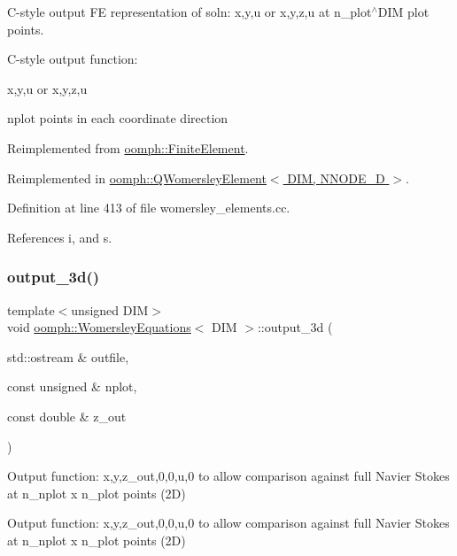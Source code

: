 C-\/style output FE representation of soln\+: x,y,u or x,y,z,u at n\+\_\+plot$^\wedge$\+D\+IM plot points. 

C-\/style output function\+:

x,y,u or x,y,z,u

nplot points in each coordinate direction 

Reimplemented from \hyperlink{classoomph_1_1FiniteElement_adfaee690bb0608f03320eeb9d110d48c}{oomph\+::\+Finite\+Element}.



Reimplemented in \hyperlink{classoomph_1_1QWomersleyElement_aedac8e0c2b41e446b7c835731b179255}{oomph\+::\+Q\+Womersley\+Element$<$ D\+I\+M, N\+N\+O\+D\+E\+\_\+D $>$}.



Definition at line 413 of file womersley\+\_\+elements.\+cc.



References i, and s.

\mbox{\label{classoomph_1_1WomersleyEquations_af97b58e933b49d84f2eda3c10fec9cd1}} 
\subsubsection{\texorpdfstring{output\+\_\+3d()}{output\_3d()}}
{\footnotesize\ttfamily template$<$unsigned D\+IM$>$ \\
void \hyperlink{classoomph_1_1WomersleyEquations}{oomph\+::\+Womersley\+Equations}$<$ D\+IM $>$\+::output\+\_\+3d (\begin{DoxyParamCaption}\item[{std\+::ostream \&}]{outfile,  }\item[{const unsigned \&}]{nplot,  }\item[{const double \&}]{z\+\_\+out }\end{DoxyParamCaption})}



Output function\+: x,y,z\+\_\+out,0,0,u,0 to allow comparison against full Navier Stokes at n\+\_\+nplot x n\+\_\+plot points (2D) 

Output function\+: x,y,z\+\_\+out,0,0,u,0 to allow comparison against full Navier Stokes at n\+\_\+nplot x n\+\_\+plot points (2D) 

